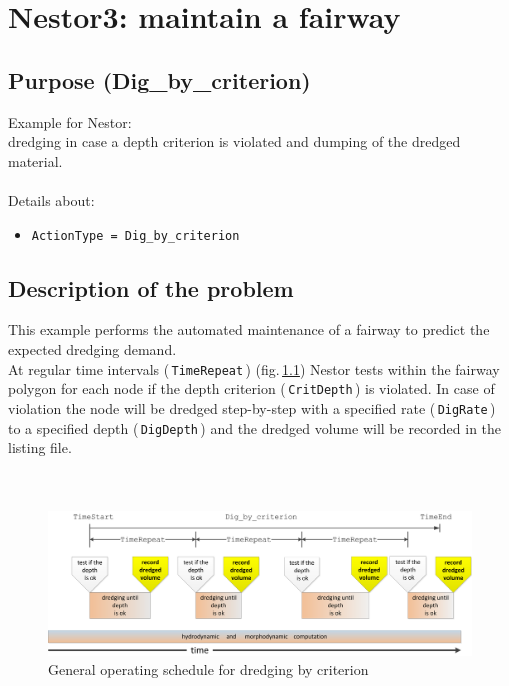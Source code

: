 \chapter{Nestor3: maintain a fairway }
%
\section{Purpose (Dig\_by\_criterion)}
Example for Nestor:\\
dredging in case a depth criterion is violated and dumping of the dredged material.\\
\\
Details about:
\begin{itemize}
\item{\texttt{ActionType = Dig\_by\_criterion}}
\end{itemize}
\section{Description of the problem}
This example performs the automated maintenance of a fairway to predict the expected dredging demand.\\
At regular time intervals (\,\texttt{TimeRepeat}\,) (fig.\,\ref{E3timeschema}) Nestor tests within the
fairway polygon for each node if the depth criterion (\,\texttt{CritDepth}\,) is violated.
In case of violation the node will be dredged step-by-step with a specified rate (\,\texttt{DigRate}\,)
to a specified depth (\,\texttt{DigDepth}\,) and the dredged volume will be recorded in the listing file.\\
\\
\\
\begin{figure} [H]
 \centering
 \includegraphics[width=1.0\linewidth]{img/zeitlAblaufSchema_DigByCrit.png}
 \caption{General operating schedule for dredging by criterion}\label{E3timeschema}
\end{figure}



